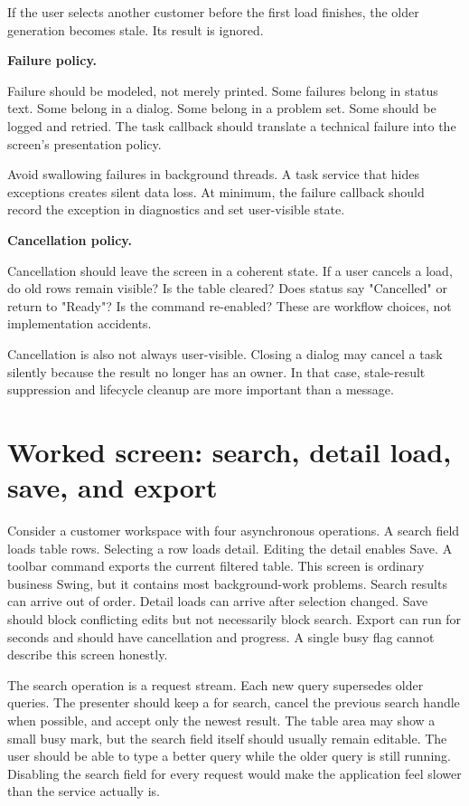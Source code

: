 If the user selects another customer before the first load finishes, the older
generation becomes stale. Its result is ignored.

\textbf{Failure policy.}

Failure should be modeled, not merely printed. Some failures belong in status
text. Some belong in a dialog. Some belong in a problem set. Some should be
logged and retried. The task callback should translate a technical failure into
the screen's presentation policy.

Avoid swallowing failures in background threads. A task service that hides
exceptions creates silent data loss. At minimum, the failure callback should
record the exception in diagnostics and set user-visible state.

\textbf{Cancellation policy.}

Cancellation should leave the screen in a coherent state. If a user cancels a
load, do old rows remain visible? Is the table cleared? Does status say
"Cancelled" or return to "Ready"? Is the command re-enabled? These are workflow
choices, not implementation accidents.

Cancellation is also not always user-visible. Closing a dialog may cancel a task
silently because the result no longer has an owner. In that case, stale-result
suppression and lifecycle cleanup are more important than a message.

\section{Worked screen: search, detail load, save, and export}

Consider a customer workspace with four asynchronous operations. A search field
loads table rows. Selecting a row loads detail. Editing the detail enables
Save. A toolbar command exports the current filtered table. This screen is
ordinary business Swing, but it contains most background-work problems. Search
results can arrive out of order. Detail loads can arrive after selection
changed. Save should block conflicting edits but not necessarily block search.
Export can run for seconds and should have cancellation and progress. A single
busy flag cannot describe this screen honestly.

The search operation is a request stream. Each new query supersedes older
queries. The presenter should keep a  for search, cancel
the previous search handle when possible, and accept only the newest result.
The table area may show a small busy mark, but the search field itself should
usually remain editable. The user should be able to type a better query while
the older query is still running. Disabling the search field for every request
would make the application feel slower than the service actually is.

